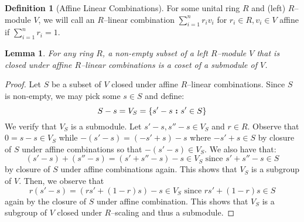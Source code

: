 \documentclass{amsart}
\newcommand{\curly}[1]{\left\{ #1 \right\}}
\newcommand{\set}[2][]{\ifthenelse{\equal{#1}{}}
                                  {\curly{#2}}
                                  {\curly{#1\ \textbf{:}\ #2}}}
\numberwithin{thm}{section}
\newtheorem{lem}[thm]{Lemma}
\theoremstyle{definition}
\newtheorem{defn}[thm]{Definition}
\begin{document}
\begin{defn}[Affine Linear Combinations]
For some unital ring $R$ and (left) $R$--module $V$, we will call
an $R$--linear combination $\sum_{i = 1}^{n} r_iv_i$ for $r_i \in R, v_i \in V$
affine if $\sum_{i = 1}^{n} r_i = 1$.
\end{defn}

\begin{lem}
For any ring $R$, a non-empty subset of a left $R$--module $V$ that is closed
under affine $R$--linear combinations is a coset of a submodule of $V$.
\end{lem}
\begin{proof}
Let $S$ be a subset of $V$ closed under affine $R$--linear combinations.
Since $S$ is non-empty, we may pick some $s \in S$ and define:
\[
S - s = V_S = \set[s' - s]{s' \in S}
\]
We verify that $V_S$ is a submodule. Let $s' - s, s'' - s \in V_S$ and
$r \in R$. Observe that $0 = s - s \in V_S$ while
$-(s' - s) = (-s' + s) - s$ where $-s' + s \in S$ by closure of $S$ under affine
combinations so that $-(s' - s) \in V_S$. We also have that:
\[
(s' - s) + (s'' - s) = (s' + s'' - s) - s \in V_S
\text{ since } s' + s'' - s \in S
\]
by closure of $S$ under affine combinations again. This shows that $V_S$ is a
subgroup of $V$. Then, we observe that
\[
r(s' - s) = (rs' + (1 - r)s) - s \in V_S \text{ since } rs' + (1 - r)s \in S
\]
again by the closure of $S$ under affine combination. This shows that
$V_S$ is a subgroup of $V$ closed under $R$--scaling and thus a submodule.
\end{proof}
\end{document}
